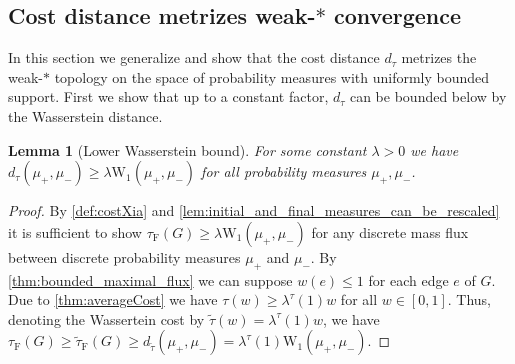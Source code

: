 \documentclass[10pt,a4paper,oneside,final]{article}
\newcommand{\Wd}[1]{\mathrm{W}_{#1}}
\newcommand{\Wdone}{\Wd{1}}
\newcommand{\JEnXia}[1][\tau]{#1_{\mathrm{F}}}%
\newcommand{\dtau}{d_\tau}
\newcommand{\transportPath}{mass flux}
\numberwithin{equation}{section}
\theoremstyle{plain}
\newtheorem{lemma}[theorem]{Lemma}
\newtheorem{corollary}[theorem]{Corollary}
\theoremstyle{definition}
\theoremstyle{remark}
\begin{document}
% 
% 


\subsection{Cost distance metrizes weak-$*$ convergence}

In this section we generalize \cite[Theorem 4.2]{Xia-Optimal-Paths} and show
that the cost distance $\dtau$ metrizes the weak-$*$ topology on the space of probability measures with uniformly bounded support.
First we show that up to a constant factor, $\dtau$ can be bounded below by the Wasserstein distance.

% 

\begin{lemma}[Lower Wasserstein bound]\label{lem:D}
For some constant $\lambda > 0$ we have $\dtau(\mu_+,\mu_-)\geq\lambda\Wdone(\mu_+,\mu_-)$ for all probability measures $\mu_+,\mu_-$.
\end{lemma}

\begin{proof}
By \cref{def:costXia} and \cref{lem:initial_and_final_measures_can_be_rescaled} it is sufficient to show $\JEnXia(G)\geq\lambda\Wdone(\mu_+,\mu_-)$ for any discrete \transportPath{} between discrete probability measures $\mu_+$ and $\mu_-$.
By \cref{thm:bounded_maximal_flux} we can suppose $w(e)\leq1$ for each edge $e$ of $G$.
Due to \cref{thm:averageCost} we have $\tau(w)\geq\lambda^\tau(1) w$ for all $w\in[0,1]$.
Thus, denoting the Wassertein cost by $\tilde\tau(w)=\lambda^\tau(1) w$, we have
$\JEnXia(G)\geq\JEnXia[\tilde\tau](G)\geq d_{\tilde\tau}(\mu_+,\mu_-)=\lambda^\tau(1)\Wdone(\mu_+,\mu_-)$.
\end{proof}
\end{document}
